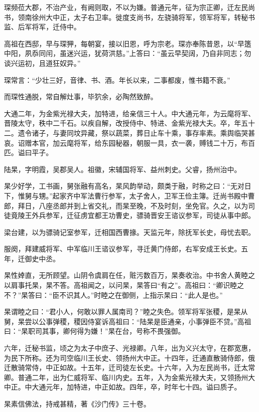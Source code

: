 \documentclass[12pt,UTF8]{ctexbook}
\begin{document}
琛频莅大郡，不治产业，有阙则取，不以为嫌。普通元年，征为宗正卿，迁左民尚书，领南徐州大中正，太子右卫率。徙度支尚书，左骁骑将军，领军将军，转秘书监、后军将军，迁侍中。

高祖在西邸，早与琛狎，每朝宴，接以旧恩，呼为宗老。琛亦奉陈昔恩，以“早簉中阳，夙忝同闬，虽迷兴运，犹荷洪慈。”上答曰：“虽云早契阔，乃自非同志；勿谈兴运初，且道狂奴异。”

琛常言：“少壮三好，音律、书、酒。年长以来，二事都废，惟书籍不衰。”

而琛性通脱，常自解灶事，毕狖余，必陶然致醉。

大通二年，为金紫光禄大夫，加特进，给亲信三十人。中大通元年，为云麾将军、晋陵太守，秩中二千石。以疾自解，改授侍中、特进、金紫光禄大夫。卒，年五十二。遗令诸子，与妻同坟异藏，祭以蔬菜，葬日止车十乘，事存率素。乘舆临哭甚哀。诏赠本官，加云麾将军，给东园秘器，朝服一具，衣一袭，赙钱二十万，布百匹。谥曰平子。

陆杲，字明霞，吴郡吴人。祖徽，宋辅国将军、益州刺史。父睿，扬州治中。

杲少好学，工书画，舅张融有高名，杲风韵举动，颇类于融，时称之曰：“无对日下，惟舅与甥。”起家齐中军法曹行参军，太子舍人，卫军王俭主簿。迁尚书殿中曹郎，拜日，八座丞郎并到上省交礼，而杲至晚，不及时刻，坐免官。久之，以为司徒竟陵王外兵参军，迁征虏宜都王功曹史，骠骑晋安王谘议参军，司徒从事中郎。

梁台建，以为骠骑记室参军，迁相国西曹掾。天监元年，除抚军长史，母忧去职。

服阕，拜建威将军、中军临川王谘议参军，寻迁黄门侍郎，右军安成王长史。五年，迁御史中丞。

杲性婞直，无所顾望。山阴令虞肩在任，赃污数百万，杲奏收治。中书舍人黄睦之以肩事托杲，杲不答。高祖闻之，以问杲，杲答曰“有之”。高祖曰：“卿识睦之不？”杲答曰：“臣不识其人。”时睦之在御侧，上指示杲曰：“此人是也。”

杲谓睦之曰：“君小人，何敢以罪人属南司？”睦之失色。领军将军张稷，是杲从舅，杲尝以公事弹稷，稷因侍宴诉高祖曰：“陆杲是臣通亲，小事弹臣不贷。”高祖曰：“杲职司其事，卿何得为嫌！”杲在台，号称不畏强御。

六年，迁秘书监，顷之为太子中庶子、光禄卿。八年，出为义兴太守，在郡宽惠，为民下所称。还为司空临川王长史、领扬州大中正。十四年，迁通直散骑侍郎，俄迁散骑常侍，中正如故。十五年，迁司徒左长史。十六年，入为左民尚书，迁太常卿。普通二年，出为仁威将军、临川内史。五年，入为金紫光禄大夫，又领扬州大中正。中大通元年，加特进，中正如故。四年，卒，时年七十四。谥曰质子。

杲素信佛法，持戒甚精，著《沙门传》三十卷。
\end{document}
